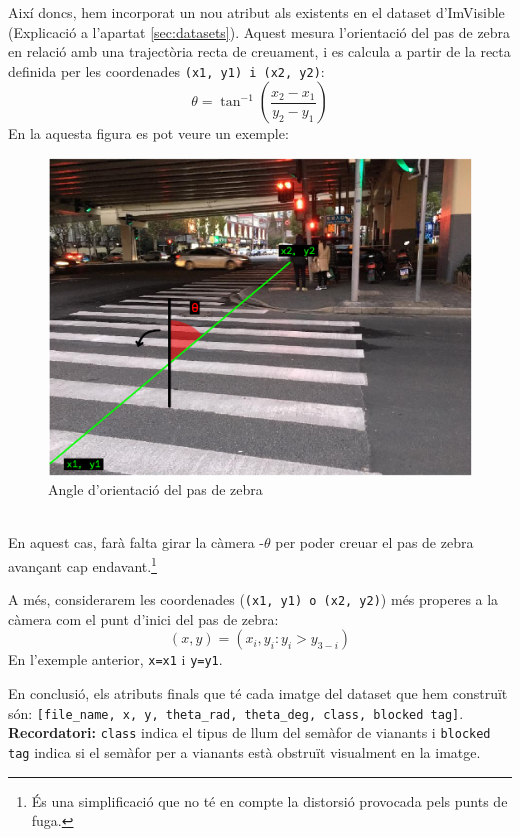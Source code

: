 \documentclass[10pt,a4paper,twocolumn,twoside]{article}
\begin{document}
Així doncs, hem incorporat un nou atribut als existents en el dataset d'ImVisible (Explicació a l'apartat \ref{sec:datasets}). Aquest mesura l’orientació del pas de zebra en relació amb una trajectòria recta de creuament, i es calcula a partir de la recta definida per les coordenades \texttt{(x1, y1) i (x2, y2)}:
\begin{equation*}
\theta = \tan^{-1}\left( \frac{x_2 - x_1}{y_2 - y_1} \right)
\end{equation*} 
En la aquesta figura es pot veure un exemple:
\begin{figure}[!h]
	\centering
	\includegraphics[width=0.95\linewidth]{figs/angle}
	\caption{Angle d'orientació del pas de zebra}
	\label{fig:angle}
\end{figure}
\\
En aquest cas, farà falta girar la càmera -$\theta$ per poder creuar el pas de zebra avançant cap endavant.\footnote{És una simplificació que no té en compte la distorsió provocada pels punts de fuga.}

A més, considerarem les coordenades (\texttt{(x1, y1) o (x2, y2)}) més properes a la càmera com el punt d'inici del pas de zebra:
\begin{equation*}
	(x, y)=(x_i, y_i : y_i > y_{3-i})
\end{equation*} 
En l'exemple anterior, \texttt{x=x1} i \texttt{y=y1}.

En conclusió, els atributs finals que té cada imatge del dataset que hem construït són: \texttt{[file\_name, x, y, theta\_rad, theta\_deg, class, blocked tag]}. \textbf{Recordatori:} \texttt{class} indica el tipus de llum del semàfor de vianants i \texttt{blocked tag} indica si el semàfor per a vianants està obstruït visualment en la imatge.
\end{document}
